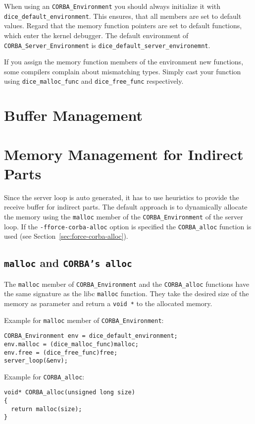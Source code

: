 When using an \verb|CORBA_Environment| you should always
initialize it with \verb|dice_default_environment|. This
ensures, that all members are set to default values.
Regard that the memory function pointers are set to
default functions, which enter the kernel debugger.
The default environment of \verb|CORBA_Server_Environment| is
\verb|dice_default_server_environemnt|.

If you assign the memory function members of the environment new functions,
some compilers complain about mismatching types.  Simply cast your function
using \verb|dice_malloc_func| and \verb|dice_free_func| respectively.

\section{Buffer Management}

\section{Memory Management for Indirect Parts}
\label{sec:mem-indirect-parts}
Since the server loop is auto generated, it has to use heuristics to provide
the receive buffer for indirect parts. The default approach is to dynamically
allocate the memory using the \verb|malloc| member of the
\verb|CORBA_Environment| of the server loop.  If the
\verb|-fforce-corba-alloc| option is specified the \verb|CORBA_alloc| function
is used (see Section~\ref{sec:force-corba-alloc}).

\subsection{{\tt malloc} and {\tt CORBA's alloc}}

The \verb|malloc| member of \verb|CORBA_Environment| and the
\verb|CORBA_alloc| functions have the same signature as the libc \verb|malloc|
function. They take the desired size of the memory as parameter and return a
\verb|void *| to the allocated memory.

Example for \verb|malloc| member of \verb|CORBA_Environment|:
\begin{verbatim}
CORBA_Environment env = dice_default_environment;
env.malloc = (dice_malloc_func)malloc;
env.free = (dice_free_func)free;
server_loop(&env);
\end{verbatim}

Example for \verb|CORBA_alloc|:
\begin{verbatim}
void* CORBA_alloc(unsigned long size)
{
  return malloc(size);
}
\end{verbatim}

